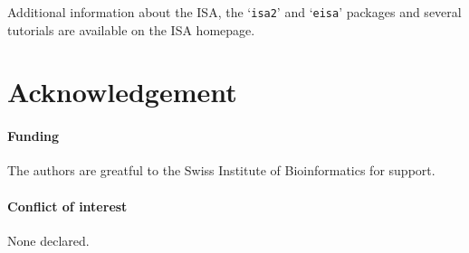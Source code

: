 \documentclass{bioinfo}
\newcommand{\Rpackage}[1]{`\texttt{#1}'}
\begin{document}
Additional information about the ISA, the \Rpackage{isa2} and
\Rpackage{eisa} packages and several tutorials are available on the
ISA homepage.

\section*{Acknowledgement}

\paragraph{Funding\textcolon} The authors are greatful to the Swiss
Institute of Bioinformatics for support.
\paragraph{Conflict of interest\textcolon} None declared.



\end{document}

